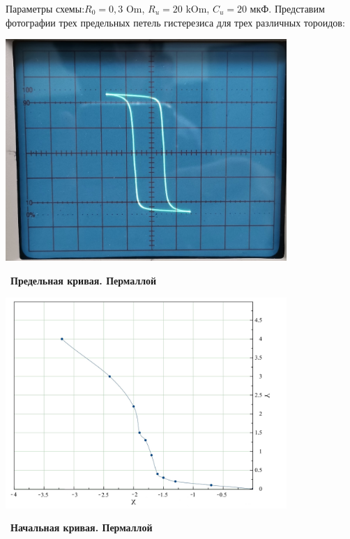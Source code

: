 \documentclass[a4paper, 14pt]{extarticle}
\begin{document}
\newpage

Параметры схемы:$R_0=0,3$ Om, $R_u=20$ kOm, $C_u=20$ мкФ.
Представим фотографии трех предельных петель гистерезиса для трех различных тороидов:

\newpage
\newpage

\begin{center}
	\includegraphics[width = 0.8\textwidth]{pics/1.jpg}
\end{center}\
\textbf{Предельная кривая. Пермаллой}


\begin{center}
	\includegraphics[width = 0.8\textwidth]{pics/1_rev.jpg}
\end{center}\
\textbf{Начальная кривая. Пермаллой}

\newpage
\end{document}
